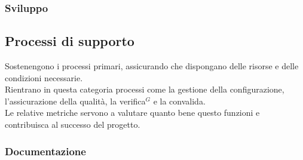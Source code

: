 \subsubsection{Sviluppo}\vspace{-0.2cm}
\begin{table}[H]
    \centering
    \renewcommand{\arraystretch}{1.15}
    \vspace{-0.3cm}
    \caption{Processi primari - Metriche del processo di sviluppo}
\end{table}

\subsection{Processi di supporto}
Sostenengono i processi primari, assicurando che dispongano delle risorse e delle condizioni necessarie.\\
Rientrano in questa categoria processi come la gestione della configurazione, l'assicurazione della qualità, la verifica$^G$ e la convalida.\\  
Le relative metriche servono a valutare quanto bene questo  funzioni e contribuisca al successo del progetto.

\subsubsection{Documentazione}\vspace{-0.2cm}
\begin{table}[h]
    \centering
    \renewcommand{\arraystretch}{1.15}
    \vspace{-0.3cm}
    \caption{Processi di supporto - Metriche del processo di documentazione}
\end{table}

